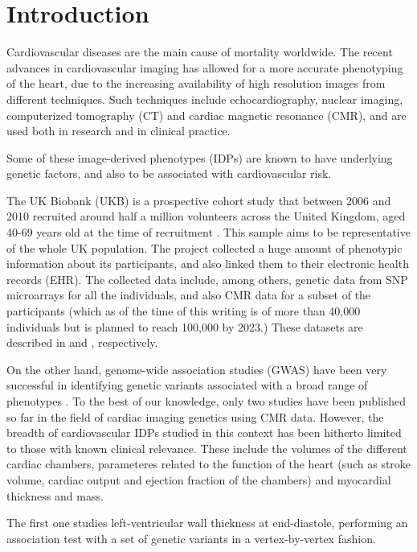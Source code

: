 \documentclass[twocolumn]{llncs}
\begin{document}
\section{Introduction}

Cardiovascular diseases are the main cause of mortality worldwide.
The recent advances in cardiovascular imaging has allowed for a more accurate phenotyping of the heart, due to the increasing availability of high resolution images from different techniques. Such techniques include echocardiography, nuclear imaging, computerized tomography (CT) and cardiac magnetic resonance (CMR), and are used both in research and in clinical practice.

Some of these image-derived phenotypes (IDPs) are known to have underlying genetic factors, and also to be associated with cardiovascular risk.

The UK Biobank (UKB) is a prospective cohort study that between 2006 and 2010 recruited around half a million volunteers across the United Kingdom, aged 40-69 years old at the time of recruitment \cite{ref_ukbb}. This sample aims to be representative of the whole UK population. The project collected a huge amount of phenotypic information about its participants, and also linked them to their electronic health records (EHR). The collected data include, among others, genetic data from SNP microarrays for all the individuals, and also CMR data for a subset of the participants (which as of the time of this writing is of more than 40,000 individuals but is planned to reach 100,000 by 2023.) These datasets are described in \cite{ref_ukbb_genetics} and \cite{ref_ukbb_cmr}, respectively.

On the other hand, genome-wide association studies (GWAS) have been very successful in identifying genetic variants associated with a broad range of phenotypes \cite{ref_gwas_review}. To the best of our knowledge, only two studies have been published so far in the field of cardiac imaging genetics using CMR data. However, the breadth of cardiovascular IDPs studied in this context has been hitherto limited to those with known clinical relevance. These include the volumes of the different cardiac chambers, parameteres related to the function of the heart (such as stroke volume, cardiac output and ejection fraction of the chambers) and myocardial thickness and mass.

The first one \cite{ref_biffi} studies left-ventricular wall thickness at end-diastole, performing an association test with a set of genetic variants in a vertex-by-vertex fashion.
\end{document}
